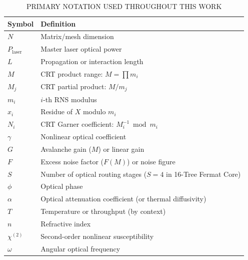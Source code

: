 \documentclass[journal]{IEEEtran}
\begin{document}
\begin{table}[H]
\centering
\caption{PRIMARY NOTATION USED THROUGHOUT THIS WORK}
\label{tab:table22}
\scriptsize
\setlength{\tabcolsep}{3pt}
\begin{tabular}{ll}
\toprule
Symbol & Definition \\
\midrule
$N$ & Matrix/mesh dimension \\
$P_{\text{laser}}$ & Master laser optical power \\
$L$ & Propagation or interaction length \\
$M$ & CRT product range: $M = \prod m_i$ \\
$M_j$ & CRT partial product: $M/m_j$ \\
$m_i$ & $i$-th RNS modulus \\
$x_i$ & Residue of $X$ modulo $m_i$ \\
$N_i$ & CRT Garner coefficient: $M_i^{-1} \bmod m_i$ \\
$\gamma$ & Nonlinear optical coefficient \\
$G$ & Avalanche gain ($M$) or linear gain \\
$F$ & Excess noise factor ($F(M)$) or noise figure \\
$S$ & Number of optical routing stages ($S=4$ in 16-Tree Fermat Core) \\
$\phi$ & Optical phase \\
$\alpha$ & Optical attenuation coefficient (or thermal diffusivity) \\
$T$ & Temperature or throughput (by context) \\
$n$ & Refractive index \\
$\chi^{(2)}$ & Second-order nonlinear susceptibility \\
$\omega$ & Angular optical frequency \\
\bottomrule
\end{tabular}
\end{table}



\end{document}
